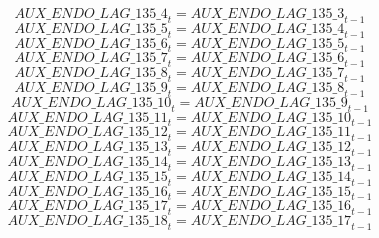 \begin{dmath}
{AUX\_ENDO\_LAG\_135\_4}_{t}={AUX\_ENDO\_LAG\_135\_3}_{t-1}
\end{dmath}
\begin{dmath}
{AUX\_ENDO\_LAG\_135\_5}_{t}={AUX\_ENDO\_LAG\_135\_4}_{t-1}
\end{dmath}
\begin{dmath}
{AUX\_ENDO\_LAG\_135\_6}_{t}={AUX\_ENDO\_LAG\_135\_5}_{t-1}
\end{dmath}
\begin{dmath}
{AUX\_ENDO\_LAG\_135\_7}_{t}={AUX\_ENDO\_LAG\_135\_6}_{t-1}
\end{dmath}
\begin{dmath}
{AUX\_ENDO\_LAG\_135\_8}_{t}={AUX\_ENDO\_LAG\_135\_7}_{t-1}
\end{dmath}
\begin{dmath}
{AUX\_ENDO\_LAG\_135\_9}_{t}={AUX\_ENDO\_LAG\_135\_8}_{t-1}
\end{dmath}
\begin{dmath}
{AUX\_ENDO\_LAG\_135\_10}_{t}={AUX\_ENDO\_LAG\_135\_9}_{t-1}
\end{dmath}
\begin{dmath}
{AUX\_ENDO\_LAG\_135\_11}_{t}={AUX\_ENDO\_LAG\_135\_10}_{t-1}
\end{dmath}
\begin{dmath}
{AUX\_ENDO\_LAG\_135\_12}_{t}={AUX\_ENDO\_LAG\_135\_11}_{t-1}
\end{dmath}
\begin{dmath}
{AUX\_ENDO\_LAG\_135\_13}_{t}={AUX\_ENDO\_LAG\_135\_12}_{t-1}
\end{dmath}
\begin{dmath}
{AUX\_ENDO\_LAG\_135\_14}_{t}={AUX\_ENDO\_LAG\_135\_13}_{t-1}
\end{dmath}
\begin{dmath}
{AUX\_ENDO\_LAG\_135\_15}_{t}={AUX\_ENDO\_LAG\_135\_14}_{t-1}
\end{dmath}
\begin{dmath}
{AUX\_ENDO\_LAG\_135\_16}_{t}={AUX\_ENDO\_LAG\_135\_15}_{t-1}
\end{dmath}
\begin{dmath}
{AUX\_ENDO\_LAG\_135\_17}_{t}={AUX\_ENDO\_LAG\_135\_16}_{t-1}
\end{dmath}
\begin{dmath}
{AUX\_ENDO\_LAG\_135\_18}_{t}={AUX\_ENDO\_LAG\_135\_17}_{t-1}
\end{dmath}
